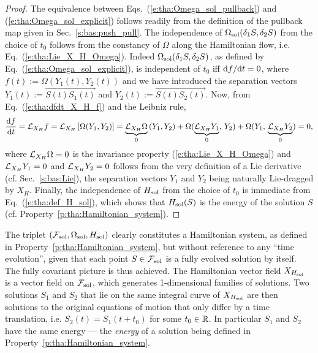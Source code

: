 \begin{proof}
The equivalence between Eqs.~(\ref{e:tha:Omega_sol_pullback}) and (\ref{e:tha:Omega_sol_explicit}) follows readily from the definition of the pullback
map given in Sec.~\ref{s:bas:push_pull}. The independence
of $\Omega_{\rm sol}(\delta_1 S, \delta_2 S)$ from the choice of $t_0$
follows from the constancy of $\Omega$ along the Hamiltonian flow, i.e.
Eq.~(\ref{e:tha:Lie_X_H_Omega}). Indeed $\Omega_{\rm sol}(\delta_1 S, \delta_2 S)$,
as defined by Eq.~(\ref{e:tha:Omega_sol_explicit}), is independent of $t_0$
iff $\mathrm{d} f / \mathrm{d} t = 0$, where
$f(t) := \Omega (Y_1(t), Y_2(t))$
and we have introduced the separation vectors $Y_1(t) := \overrightarrow{S(t)S_1(t)}$ and $Y_2(t) := \overrightarrow{S(t)S_2(t)}$. Now, from Eq.~(\ref{e:tha:dfdt_X_H_f})
and the Leibniz rule,
\[
    \frac{\mathrm{d} f}{\mathrm{d} t} = \mathcal{L}_{X_H} f
    = \mathcal{L}_{X_H} \left[ \Omega (Y_1, Y_2) \right]
    = \underbrace{\mathcal{L}_{X_H} \Omega}_{0} \,  (Y_1, Y_2)
        + \Omega( \underbrace{\mathcal{L}_{X_H} Y_1}_{0}, \, Y_2 )
        + \Omega(  Y_1,\,  \underbrace{\mathcal{L}_{X_H} Y_2}_{0} )
    = 0,
\]
where $\mathcal{L}_{X_H} \Omega = 0$ is the invariance property (\ref{e:tha:Lie_X_H_Omega})
and $\mathcal{L}_{X_H} Y_1 = 0$ and $\mathcal{L}_{X_H} Y_2 = 0$ follows from the very definition
of a Lie derivative (cf. Sec.~\ref{s:bas:Lie}),
the separation vectors $Y_1$ and $Y_2$ being naturally Lie-dragged by $X_H$.
Finally, the independence of $H_{\rm sol}$ from the choice of $t_0$
is immediate from Eq.~(\ref{e:tha:def_H_sol}), which shows that
$H_{\rm sol}(S)$ is the energy of the solution $S$
(cf. Property~\ref{p:tha:Hamiltonian_system}).
\end{proof}

The triplet $(\mathcal{F}_{\rm sol}, \Omega_{\rm sol}, H_{\rm sol})$ clearly constitutes
a Hamiltonian system, as defined in Property~\ref{p:tha:Hamiltonian_system}, but
without reference to any ``time evolution'', given that each point $S\in\mathcal{F}_{\rm sol}$
is a fully evolved solution by itself. The fully covariant picture is thus achieved.
The Hamiltonian vector field $X_{H_{\rm sol}}$ is a vector field on $\mathcal{F}_{\rm sol}$,
which generates 1-dimensional families of solutions. Two solutions $S_1$ and $S_2$
that lie on the same integral curve of $X_{H_{\rm sol}}$ are then
solutions to the original equations of motion that only differ by a time translation,
i.e. $S_2(t) = S_1(t + t_0)$ for some $t_0\in\mathbb{R}$. In particular $S_1$ and $S_2$
have the same energy --- the \emph{energy} of a solution being defined in
Property~\ref{p:tha:Hamiltonian_system}.



